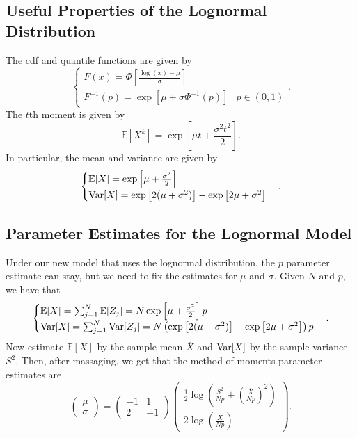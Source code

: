 \documentclass{article}
\begin{document}
\subsection{Useful Properties of the Lognormal Distribution}
The cdf and quantile functions are given by
\[
  \begin{cases}
    F(x) = \Phi\left[\frac{\log(x)-\mu}\sigma\right] \\
    F^{-1}(p) = \exp\left[\mu + \sigma\Phi^{-1}(p)\right] & p\in(0,1)
  \end{cases}.
\]
The $t$th moment is given by
\[
  \mathbb E\left[X^k\right] = \exp\left[\mu t + \frac{\sigma^2t^2}2\right].
\]
In particular, the mean and variance are given by
\[
  \begin{cases}
    \mathbb E[X] = \exp\left[\mu + \frac{\sigma^2}2\right] \\
    \operatorname{Var}[X] = \exp\left[2(\mu+\sigma^2)\right] - \exp\left[2\mu+\sigma^2\right]
  \end{cases}.
\]

\subsection{Parameter Estimates for the Lognormal Model}
Under our new model that uses the lognormal distribution, the $p$ parameter estimate can stay, but we need to fix the estimates for $\mu$ and $\sigma$. Given $N$ and $p$, we have that
\[
  \begin{cases}
    \mathbb E[X] = \sum_{j=1}^N \mathbb E[Z_j] = N\exp\left[\mu + \frac{\sigma^2}2\right]p \\
    \operatorname{Var}[X] = \sum_{j=1}^N \operatorname{Var}[Z_j] = N\left(\exp\left[2(\mu+\sigma^2)\right] - \exp\left[2\mu+\sigma^2\right]\right)p
  \end{cases}.
\]
Now estimate $\mathbb E[X]$ by the sample mean $\overline X$ and $\operatorname{Var}[X]$ by the sample variance $S^2$. Then, after massaging, we get that the method of moments parameter estimates are
\[
  \begin{pmatrix}\mu\\\sigma\end{pmatrix} = \begin{pmatrix}-1&1\\2&-1\end{pmatrix}\begin{pmatrix}\frac12\log\left(\frac{S^2}{Np} + \left(\frac{\overline X}{Np}\right)^2\right)\\2\log\left(\frac{\overline X}{Np}\right)\end{pmatrix}.
\]
\end{document}
